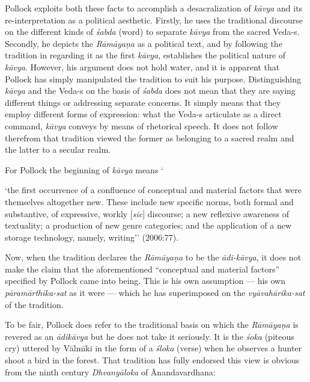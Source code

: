 Pollock exploits both these facts to accomplish a desacralization
 of \textsl{kāvya} and its re-interpretation as a political aesthetic. Firstly, he uses the traditional discourse on the different kinds of \textsl{śabda} (word) to separate \textsl{kāvya} from the sacred Veda-s. Secondly, he depicts the \textsl{Rāmāyaṇa} as a political text, and by following the tradition in regarding it as the first \textsl{kāvya}, establishes the political nature of \textsl{kāvya}. However, his argument does not hold water, and it is apparent that Pollock has simply manipulated the tradition to suit his purpose. Distinguishing \textsl{kāvya} and the Veda-s on the basis of \textsl{śabda} does not mean that they are saying different things or addressing separate concerns. It simply means that they employ different forms of expression: what the Veda-s articulate as a direct command, \textsl{kāvya} conveys by means of rhetorical speech. It does not follow therefrom that tradition viewed the former as belonging to a sacred realm and the latter to a secular realm. 

For Pollock the beginning of \textsl{kāvya} means `

\begin{myquote}
`the first occurrence of a confluence of conceptual and material factors that were themselves altogether new. These include new specific norms, both formal and substantive, of expressive, workly [\textsl{sic}] discourse; a new reflexive awareness of textuality; a production of new genre categories; and the application of a new storage technology, namely, writing'' (2006:77). 
\end{myquote}

Now, when the tradition declares the \textsl{Rāmāyaṇa} to be the \textsl{ādi-kāvya}, it does not make the claim that the aforementioned ``conceptual and material factors'' specified by Pollock came into being. This is his own assumption --- his own \textsl{pāramārthika-sat} as it were --- which he has superimposed on the \textsl{vyāvahārika-sat} of the tradition.

To be fair, Pollock does refer to the traditional basis on which the \textsl{Rāmāyaṇa} is revered as an \textsl{ādikāvya} but he does not take it seriously. It is the \textsl{śoka} (piteous cry) uttered by Vālmīki in the form of a \textsl{śloka} (verse) when he observes a hunter shoot a bird in the forest. That tradition has fully endorsed this view is obvious from the ninth century \textsl{Dhvanyāloka} of Ānandavardhana: 

